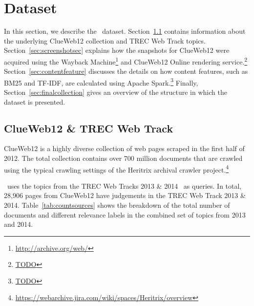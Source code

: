 
\section{Dataset}\label{sec:dataset}
In this section, we describe the \datasetname~data\-set. Section~\ref{sec:trecclue} contains information about the underlying ClueWeb12 collection and TREC Web Track topics. Section~\ref{sec:screenshotsec} explains how the snapshots for ClueWeb12 were acquired using the Wayback Machine\footnote{\url{http://archive.org/web/}} and ClueWeb12 Online rendering service.\footnote{\url{TODO}} Section~\ref{sec:contentfeature} discusses the details on how content features, such as BM25 and TF-IDF, are calculated using Apache Spark.\footnote{\url{TODO}} Finally, Section~\ref{sec:finalcollection} gives an overview of the structure in which the \datasetname dataset is presented.

\subsection{ClueWeb12 \& TREC Web Track}\label{sec:trecclue}
ClueWeb12 is a highly diverse collection of web pages scraped in the first half of 2012.
The total collection contains over 700 million documents that are crawled using the typical crawling settings of the Heritrix archival crawler project.\footnote{\url{https://webarchive.jira.com/wiki/spaces/Heritrix/overview}}

\datasetname~uses the topics from the TREC Web Tracks 2013 \& 2014~\cite{collins2013trec,collins2015trec} as queries.
In total, 28,906 pages from ClueWeb12 have judgements in the TREC Web Track 2013 \& 2014.
Table~\ref{tab:countsources} shows the breakdown of the total number of documents and different relevance labels in the combined set of topics from 2013 and 2014.

